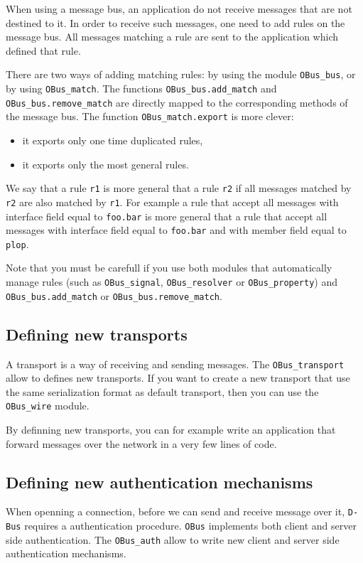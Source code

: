 \documentclass{article}
\newcommand{\obus}{\texttt{OBus}\xspace}
\newcommand{\dbus}{\texttt{D-Bus}\xspace}
\begin{document}
When using a message bus, an application do not receive messages that
are not destined to it. In order to receive such messages, one need to
add rules on the message bus. All messages matching a rule are sent to
the application which defined that rule.

There are two ways of adding matching rules: by using the module
\texttt{OBus\_bus}, or by using \texttt{OBus\_match}. The functions
\texttt{OBus\_bus.add\_match} and \texttt{OBus\_bus.remove\_match} are
directly mapped to the corresponding methods of the message bus. The
function \texttt{OBus\_match.export} is more clever:

\begin{itemize}
\item it exports only one time duplicated rules,
\item it exports only the most general rules.
\end{itemize}

We say that a rule \texttt{r1} is more general that a rule \texttt{r2}
if all messages matched by \texttt{r2} are also matched by
\texttt{r1}.  For example a rule that accept all messages with
interface field equal to \texttt{foo.bar} is more general that a rule
that accept all messages with interface field equal to
\texttt{foo.bar} and with member field equal to \texttt{plop}.

Note that you must be carefull if you use both modules that
automatically manage rules (such as \texttt{OBus\_signal},
\texttt{OBus\_resolver} or \texttt{OBus\_property}) and
\texttt{OBus\_bus.add\_match} or \texttt{OBus\_bus.remove\_match}.

\subsection{Defining new transports}

A transport is a way of receiving and sending messages. The
\texttt{OBus\_transport} allow to defines new transports. If you want
to create a new transport that use the same serialization format as
default transport, then you can use the \texttt{OBus\_wire} module.

By definning new transports, you can for example write an application
that forward messages over the network in a very few lines of code.

\subsection{Defining new authentication mechanisms}

When openning a connection, before we can send and receive message
over it, \dbus requires a authentication procedure. \obus implements
both client and server side authentication.  The \texttt{OBus\_auth}
allow to write new client and server side authentication mechanisms.
\end{document}
